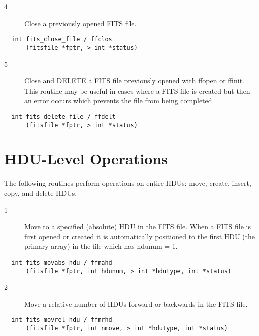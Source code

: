 \begin{description}
\item[4 ]Close a previously opened FITS file.
\end{description}

\begin{verbatim}
  int fits_close_file / ffclos
      (fitsfile *fptr, > int *status)
\end{verbatim}

\begin{description}
\item[5 ] Close and DELETE a FITS file previously opened with ffopen or ffinit.
    This routine may be  useful in cases where a FITS file is created but
   then an error occurs which prevents the file from being completed.
\end{description}

\begin{verbatim}
  int fits_delete_file / ffdelt
      (fitsfile *fptr, > int *status)
\end{verbatim}


\section{HDU-Level Operations\label{FFMAHD}}

The following routines perform operations on entire HDUs: move, create,
insert, copy, and delete HDUs.


\begin{description}
\item[1 ] Move to a specified (absolute) HDU in the FITS file.  When a FITS file
    is first opened or created it is automatically positioned to the first
   HDU (the primary array) in the file which has hdunum = 1.
\end{description}

\begin{verbatim}
  int fits_movabs_hdu / ffmahd
      (fitsfile *fptr, int hdunum, > int *hdutype, int *status)
\end{verbatim}

\begin{description}
\item[2 ]Move a relative number of HDUs forward or backwards in the FITS file.
\end{description}

\begin{verbatim}
  int fits_movrel_hdu / ffmrhd
      (fitsfile *fptr, int nmove, > int *hdutype, int *status)
\end{verbatim}

